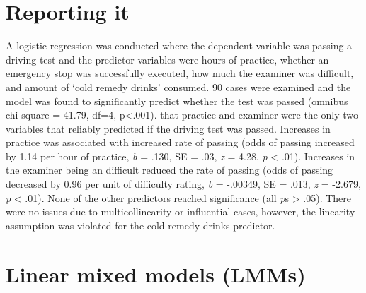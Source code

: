 \documentclass[]{article}
\begin{document}
\section{Reporting it}\label{reporting-it}

A logistic regression was conducted where the dependent variable was
passing a driving test and the predictor variables were hours of
practice, whether an emergency stop was successfully executed, how much
the examiner was difficult, and amount of `cold remedy drinks' consumed.
90 cases were examined and the model was found to significantly predict
whether the test was passed (omnibus chi-square = 41.79, df=4,
p\textless{}.001). that practice and examiner were the only two
variables that reliably predicted if the driving test was passed.
Increases in practice was associated with increased rate of passing
(odds of passing increased by 1.14 per hour of practice, \emph{b} =
.130, SE = .03, \emph{z} = 4.28, \emph{p} \textless{} .01). Increases in
the examiner being an difficult reduced the rate of passing (odds of
passing decreased by 0.96 per unit of difficulty rating, \emph{b} =
-.00349, SE = .013, \emph{z} = -2.679, \emph{p} \textless{} .01). None
of the other predictors reached significance (all \emph{p}s
\textgreater{} .05). There were no issues due to multicollinearity or
influential cases, however, the linearity assumption was violated for
the cold remedy drinks predictor.

\section{Linear mixed models (LMMs)}\label{linear-mixed-models-lmms}
\end{document}
